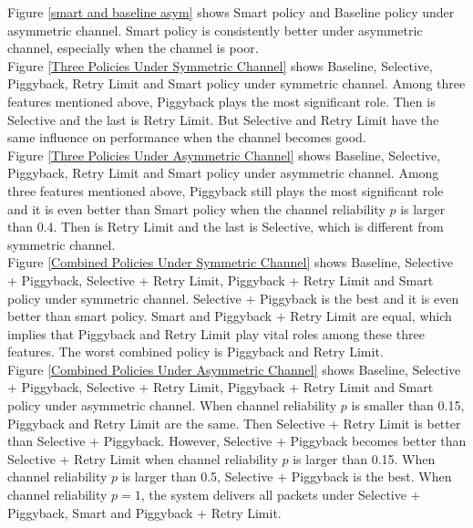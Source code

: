 \documentclass{article}
\begin{document}
Figure \ref{smart and baseline asym} shows Smart policy and Baseline policy under asymmetric channel. Smart policy is consistently better under asymmetric channel, especially when the channel is poor. \\

Figure \ref{Three Policies Under Symmetric Channel} shows Baseline, Selective, Piggyback, Retry Limit and Smart policy under symmetric channel. Among three features mentioned above, Piggyback plays the most significant role. Then is Selective and the last is Retry Limit. But Selective and Retry Limit have the same influence on performance when the channel becomes good. \\

Figure \ref{Three Policies Under Asymmetric Channel} shows Baseline, Selective, Piggyback, Retry Limit and Smart policy under asymmetric channel. Among three features mentioned above, Piggyback still plays the most significant role and it is even better than Smart policy when the channel reliability $p$ is larger than 0.4. Then is Retry Limit and the last is Selective, which is different from symmetric channel. \\

Figure \ref{Combined Policies Under Symmetric Channel} shows Baseline, Selective + Piggyback, Selective + Retry Limit, Piggyback + Retry Limit and Smart policy under symmetric channel. Selective + Piggyback is the best and it is even better than smart policy. Smart and Piggyback + Retry Limit are equal, which implies that Piggyback and Retry Limit play vital roles among these three features. The worst combined policy is Piggyback and Retry Limit. \\

Figure \ref{Combined Policies Under Asymmetric Channel} shows Baseline, Selective + Piggyback, Selective + Retry Limit, Piggyback + Retry Limit and Smart policy under asymmetric channel. When channel reliability $p$ is smaller than 0.15, Piggyback and Retry Limit are the same. Then Selective + Retry Limit is better than Selective + Piggyback. However, Selective + Piggyback becomes better than Selective + Retry Limit when channel reliability $p$ is larger than 0.15. When channel reliability $p$ is larger than 0.5, Selective + Piggyback is the best. When channel reliability $p=1$, the system delivers all packets under Selective + Piggyback, Smart and Piggyback + Retry Limit. \\
\end{document}
